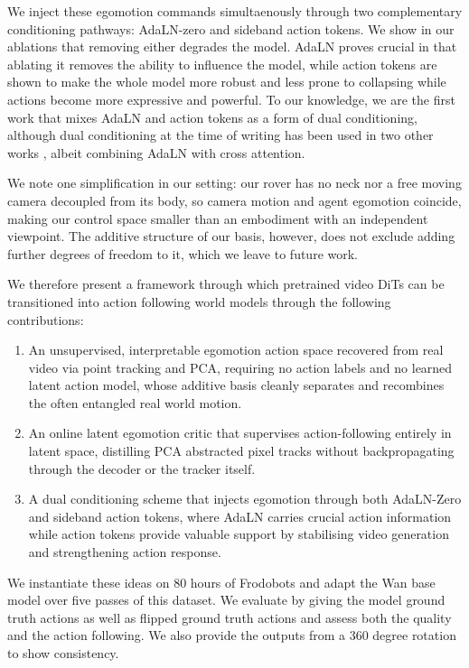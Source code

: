 \documentclass[letterpaper]{article} %
\begin{document}
We inject these egomotion commands simultaenously through two complementary conditioning pathways: AdaLN-zero and sideband action tokens. We show in our ablations that removing either degrades the model. AdaLN proves crucial in that ablating it removes the ability to influence the model, while action tokens are shown to make the whole model more robust and less prone to collapsing while actions become more expressive and powerful. To our knowledge, we are the first work that mixes AdaLN and action tokens as a form of dual conditioning, although dual conditioning at the time of writing has been used in two other works \cite{wovr, dexac}, albeit combining AdaLN with cross attention.

We note one simplification in our setting: our rover has no neck nor a free moving camera decoupled from its body, so camera motion and agent egomotion coincide, making our control space smaller than an embodiment with an independent viewpoint. The additive structure of our basis, however, does not exclude adding further degrees of freedom to it, which we leave to future work.

We therefore present a framework through which pretrained video DiTs can be transitioned into action following world models through the following contributions:
\begin{enumerate}

\item An unsupervised, interpretable egomotion action space recovered from real video via point tracking and PCA, requiring no action labels and no learned latent action model, whose additive basis cleanly separates and recombines the often entangled real world motion.

\item An online latent egomotion critic that supervises action-following entirely in latent space, distilling PCA abstracted pixel tracks without backpropagating through the decoder or the tracker itself.

\item A dual conditioning scheme that injects egomotion through both AdaLN-Zero and sideband action tokens, where AdaLN carries crucial action information while action tokens provide valuable support by stabilising video generation and strengthening action response.

\end{enumerate}

We instantiate these ideas on 80 hours of Frodobots and adapt the Wan base model over five passes of this dataset. We evaluate by giving the model ground truth actions as well as flipped ground truth actions and assess both the quality and the action following. We also provide the outputs from a 360 degree rotation to show consistency.
\end{document}

